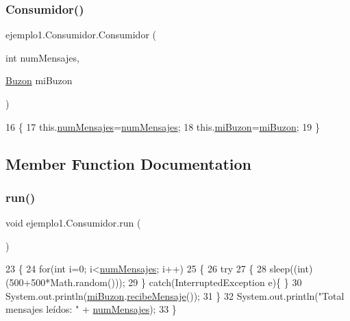 \subsubsection{\texorpdfstring{Consumidor()}{Consumidor()}}
{\footnotesize\ttfamily ejemplo1.\+Consumidor.\+Consumidor (\begin{DoxyParamCaption}\item[{int}]{num\+Mensajes,  }\item[{\mbox{\hyperlink{classejemplo1_1_1_buzon}{Buzon}}}]{mi\+Buzon }\end{DoxyParamCaption})\hspace{0.3cm}{\ttfamily [inline]}}


\begin{DoxyCode}
16     \{
17         this.\mbox{\hyperlink{classejemplo1_1_1_consumidor_a63ff895e6df26250998a4f92ce1ec6ef}{numMensajes}}=\mbox{\hyperlink{classejemplo1_1_1_consumidor_a63ff895e6df26250998a4f92ce1ec6ef}{numMensajes}};
18         this.\mbox{\hyperlink{classejemplo1_1_1_consumidor_acf30410cc121fa5cdca21e474da6ef99}{miBuzon}}=\mbox{\hyperlink{classejemplo1_1_1_consumidor_acf30410cc121fa5cdca21e474da6ef99}{miBuzon}};
19     \}
\end{DoxyCode}


\subsection{Member Function Documentation}
\mbox{\label{classejemplo1_1_1_consumidor_a4f9b27a19f8517a2f3983610ef61a26f}} 
\subsubsection{\texorpdfstring{run()}{run()}}
{\footnotesize\ttfamily void ejemplo1.\+Consumidor.\+run (\begin{DoxyParamCaption}{ }\end{DoxyParamCaption})\hspace{0.3cm}{\ttfamily [inline]}}


\begin{DoxyCode}
23     \{
24         \textcolor{keywordflow}{for}(\textcolor{keywordtype}{int} i=0; i<\mbox{\hyperlink{classejemplo1_1_1_consumidor_a63ff895e6df26250998a4f92ce1ec6ef}{numMensajes}}; i++)
25         \{
26             \textcolor{keywordflow}{try}
27             \{
28                 sleep((\textcolor{keywordtype}{int})(500+500*Math.random()));
29             \} \textcolor{keywordflow}{catch}(InterruptedException e)\{ \}
30             System.out.println(\mbox{\hyperlink{classejemplo1_1_1_consumidor_acf30410cc121fa5cdca21e474da6ef99}{miBuzon}}.\mbox{\hyperlink{classejemplo1_1_1_buzon_a198396f4151d8359e98a2aa7e66729af}{recibeMensaje}}());
31         \}
32         System.out.println(\textcolor{stringliteral}{"Total mensajes leídos: "} + \mbox{\hyperlink{classejemplo1_1_1_consumidor_a63ff895e6df26250998a4f92ce1ec6ef}{numMensajes}});
33     \}
\end{DoxyCode}


